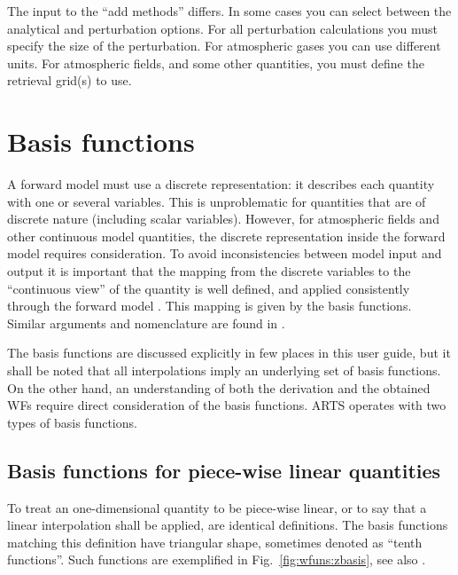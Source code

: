 The input to the ``add methods'' differs. In some cases you can select between
the analytical and perturbation options. For all perturbation calculations you
must specify the size of the perturbation. For atmospheric gases you can use
different units. For atmospheric fields, and some other quantities, you must
define the retrieval grid(s) to use.



 
\section{Basis functions}
\label{sec:wfuns:basis}

A forward model must use a discrete representation: it describes each quantity
with one or several variables. This is unproblematic for quantities that are of
discrete nature (including scalar variables). However, for atmospheric fields
and other continuous model quantities, the discrete representation inside the
forward model requires consideration. To avoid inconsistencies between model
input and output it is important that the mapping from the discrete variables
to the ``continuous view'' of the quantity is well defined, and applied
consistently through the forward model . This mapping is given by the basis
functions. Similar arguments and nomenclature are found
in \citet{read:thecl:06}.

The basis functions are discussed explicitly in few places in this user
guide, but it shall be noted that all interpolations imply an underlying set
of basis functions. On the other hand, an understanding of both the derivation
and the obtained WFs require direct consideration of the basis functions. ARTS
operates with two types of basis functions.




\subsection{Basis functions for piece-wise linear quantities}
\label{sec:wfuns:basis1}
%
To treat an one-dimensional quantity to be piece-wise linear, or to say that a
linear interpolation shall be applied, are identical definitions. The basis
functions matching this definition have triangular shape, sometimes denoted as
``tenth functions''. Such functions are exemplified in
Fig.~\ref{fig:wfuns:zbasis}, see also \citet{buehler:artst:05}.

